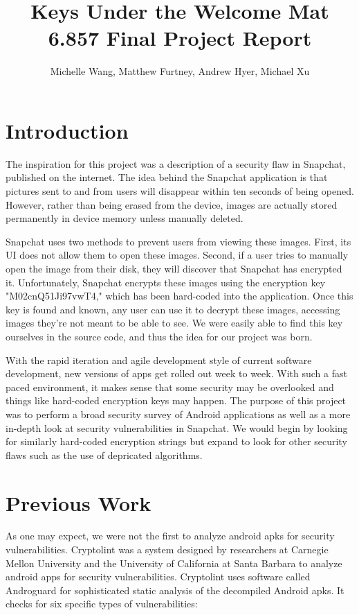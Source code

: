 \documentclass[11pt]{article}
\title{Keys Under the Welcome Mat \\ 6.857 Final Project Report}
\author{Michelle Wang, Matthew Furtney, Andrew Hyer, Michael Xu}
\numberwithin{theorem}{subsection}
\begin{document}
\maketitle

\section{Introduction}

The inspiration for this project was a description of a security flaw in Snapchat, published on the internet.\cite{snapchatFlaw1} 
The idea behind the Snapchat application is that pictures sent to and from users will disappear within ten seconds of being opened. 
However, rather than being erased from the device, images are actually stored permanently in device memory unless manually deleted. 

Snapchat uses two methods to prevent users from viewing these images.  First, its UI does not allow them to open these images.  Second,
if a user tries to manually open the image from their disk, they will discover that Snapchat has encrypted it.  Unfortunately, Snapchat
encrypts these images using the encryption key "M02cnQ51Ji97vwT4," which has been hard-coded into the application. Once this key is found 
and known, any user can use it to decrypt these images, accessing images they're not meant to be able to see. We were easily able to find 
this key ourselves in the source code, and thus the idea for our project was born.

With the rapid iteration and agile development style of current software development, new versions of apps get rolled out week to week. With such a fast paced environment, it makes sense that some security may be overlooked and things like hard-coded encryption keys may happen. The purpose of this project was to perform a broad security survey of Android applications as well as a more in-depth look at security vulnerabilities in Snapchat. We would begin by looking for similarly hard-coded encryption strings but expand to look for other security flaws such as the use of depricated algorithms.

\section{Previous Work}

As one may expect, we were not the first to analyze android apks for security vulnerabilities.
Cryptolint was a system designed by researchers at Carnegie Mellon University and the University of California at Santa Barbara to analyze android apps for security vulnerabilities. 
Cryptolint uses software called Androguard for sophisticated static analysis of the decompiled Android apks.
It checks for six specific types of vulnerabilities: 
\end{document}
